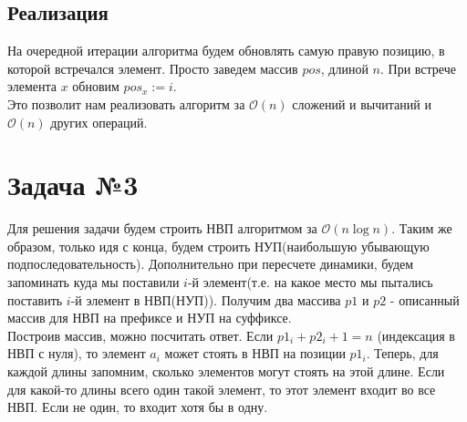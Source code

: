 \documentclass{article}
\begin{document}
\subsection*{Реализация}
На очередной итерации алгоритма будем обновлять самую правую позицию, в которой встречался элемент. Просто заведем массив $pos$, длиной $n$. При встрече элемента $x$ обновим $pos_x := i$.\\
Это позволит нам реализовать алгоритм за $\mathcal{O}(n)$ сложений и вычитаний и $\mathcal{O}(n)$ других операций.


\section*{Задача №3}
Для решения задачи будем строить НВП алгоритмом за $\mathcal{O}(n\log{n})$. Таким же образом, только идя с конца, будем строить НУП(наибольшую убывающую подпоследовательность). Дополнительно при пересчете динамики, будем запоминать куда мы поставили $i$-й  элемент(т.е. на какое место мы пытались поставить $i$-й элемент в НВП(НУП)). Получим два массива $p1$ и $p2$ - описанный массив для НВП на префиксе и НУП на суффиксе.
\\
Построив массив, можно посчитать ответ. Если $p1_i + p2_i + 1 = n$ (индексация в НВП с нуля), то элемент $a_i$ может стоять в НВП на позиции $p1_i$. Теперь, для каждой длины запомним, сколько элементов могут стоять на этой длине. Если для какой-то длины всего один такой элемент, то этот элемент входит во все НВП. Если не один, то входит хотя бы в одну.
\end{document}

